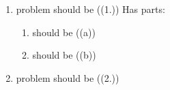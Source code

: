 \documentclass[10pt]{book}
\begin{document}

\begin{enumerate}
\item problem should be ((1.)) Has parts:
\begin{enumerate}
\item should be ((a))
\item should be ((b))
\end{enumerate}
\item problem should be ((2.))
\end{enumerate}
\end{document}
